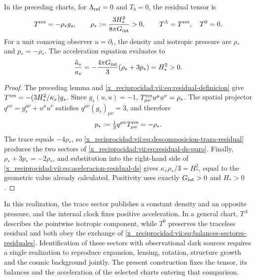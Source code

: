 \begin{theorem}
\label{x_reciprocidad:vii:thm:residual-ds-aceleracion}
In the preceding charts, for \(\Lambda_{\rm ref}=0\) and \(T_b=0\),
the residual tensor is
\begin{equation}
 T^{\rm res}=-\rho_*g_s,\qquad
 \rho_*:=\frac{3H_*^2}{8\pi G_{\rm int}}>0,
 \qquad T^\Lambda=T^{\rm res},\quad T^0=0.
 \label{x_reciprocidad:vii:eq:residual-ds-puro}
\end{equation}
For a unit comoving observer \(u=\partial_t\), the density and
isotropic pressure are \(\rho_*\) and \(p_*=-\rho_*\).
The acceleration equation evaluates to
\begin{equation}
 \frac{\ddot a_s}{a_s}
 =-\frac{4\pi G_{\rm int}}3(\rho_*+3p_*)=H_*^2>0.
 \label{x_reciprocidad:vii:eq:aceleracion-residual-ds}
\end{equation}
\end{theorem}
\begin{proof}
The preceding lemma and \eqref{x_reciprocidad:vii:eq:residual-definicion} give
\(T^{\rm res}=-(3H_*^2/\kappa_x)g_s\).
Since \(g_s(u,u)=-1\),
\(T^{\rm res}_{\mu\nu}u^\mu u^\nu=\rho_*\).
The spatial projector \(q^{\mu\nu}=g_s^{\mu\nu}+u^\mu u^\nu\)
satisfies \(q^{\mu\nu}(g_s)_{\mu\nu}=3\), and therefore
\[
 p_*:=\tfrac13q^{\mu\nu}T^{\rm res}_{\mu\nu}=-\rho_*.
\]
The trace equals \(-4\rho_*\), so
\eqref{x_reciprocidad:vii:eq:descomposicion-traza-residual} produces the two sectors
of \eqref{x_reciprocidad:vii:eq:residual-ds-puro}. Finally,
\(\rho_*+3p_*=-2\rho_*\), and substitution into the right-hand side
of \eqref{x_reciprocidad:vii:eq:aceleracion-residual-ds} gives
\(\kappa_x\rho_*/3=H_*^2\), equal to the geometric value already calculated.
Positivity uses exactly \(G_{\rm int}>0\) and \(H_*>0\).
\end{proof}

In this realization, the trace sector publishes a constant density
and an opposite pressure, and the internal clock fixes positive acceleration.
In a general chart, \(T^\Lambda\) describes the pointwise isotropic
component, while \(T^0\) preserves the traceless residual and both
obey the exchange of \eqref{x_reciprocidad:vii:eq:balances-sectores-residuales}.
Identification of these sectors with observational dark sources
requires a single realization to reproduce expansion,
lensing, rotation, structure growth and the cosmic background jointly. The
present construction fixes the tensor, its balances and the acceleration of
the selected charts entering that comparison.

